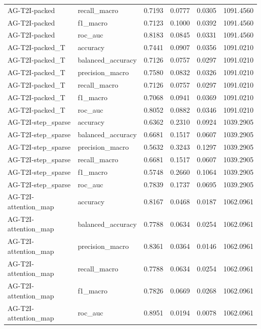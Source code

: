 \begin{tabular}{llrrrr}
AG-T2I-packed & recall_macro & 0.7193 & 0.0777 & 0.0305 & 1091.4560 \\
AG-T2I-packed & f1_macro & 0.7123 & 0.1000 & 0.0392 & 1091.4560 \\
AG-T2I-packed & roc_auc & 0.8183 & 0.0845 & 0.0331 & 1091.4560 \\
AG-T2I-packed_T & accuracy & 0.7441 & 0.0907 & 0.0356 & 1091.0210 \\
AG-T2I-packed_T & balanced_accuracy & 0.7126 & 0.0757 & 0.0297 & 1091.0210 \\
AG-T2I-packed_T & precision_macro & 0.7580 & 0.0832 & 0.0326 & 1091.0210 \\
AG-T2I-packed_T & recall_macro & 0.7126 & 0.0757 & 0.0297 & 1091.0210 \\
AG-T2I-packed_T & f1_macro & 0.7068 & 0.0941 & 0.0369 & 1091.0210 \\
AG-T2I-packed_T & roc_auc & 0.8052 & 0.0882 & 0.0346 & 1091.0210 \\
AG-T2I-step_sparse & accuracy & 0.6362 & 0.2310 & 0.0924 & 1039.2905 \\
AG-T2I-step_sparse & balanced_accuracy & 0.6681 & 0.1517 & 0.0607 & 1039.2905 \\
AG-T2I-step_sparse & precision_macro & 0.5632 & 0.3243 & 0.1297 & 1039.2905 \\
AG-T2I-step_sparse & recall_macro & 0.6681 & 0.1517 & 0.0607 & 1039.2905 \\
AG-T2I-step_sparse & f1_macro & 0.5748 & 0.2660 & 0.1064 & 1039.2905 \\
AG-T2I-step_sparse & roc_auc & 0.7839 & 0.1737 & 0.0695 & 1039.2905 \\
AG-T2I-attention_map & accuracy & 0.8167 & 0.0468 & 0.0187 & 1062.0961 \\
AG-T2I-attention_map & balanced_accuracy & 0.7788 & 0.0634 & 0.0254 & 1062.0961 \\
AG-T2I-attention_map & precision_macro & 0.8361 & 0.0364 & 0.0146 & 1062.0961 \\
AG-T2I-attention_map & recall_macro & 0.7788 & 0.0634 & 0.0254 & 1062.0961 \\
AG-T2I-attention_map & f1_macro & 0.7826 & 0.0669 & 0.0268 & 1062.0961 \\
AG-T2I-attention_map & roc_auc & 0.8951 & 0.0194 & 0.0078 & 1062.0961 \\
\bottomrule
\end{tabular}

